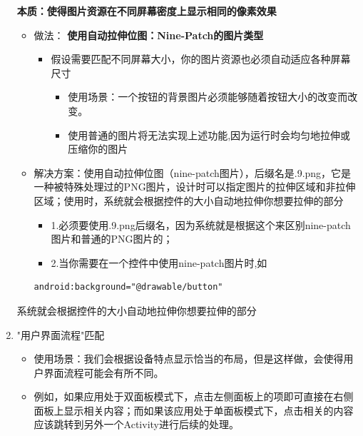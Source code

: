 \documentclass[9pt, b5paper]{article}
\begin{document}
\begin{enumerate}
\textbf{本质：使得图片资源在不同屏幕密度上显示相同的像素效果}
\begin{itemize}
\item 做法： \textbf{使用自动拉伸位图：Nine-Patch的图片类型}
\begin{itemize}
\item 假设需要匹配不同屏幕大小，你的图片资源也必须自动适应各种屏幕尺寸
\begin{itemize}
\item 使用场景：一个按钮的背景图片必须能够随着按钮大小的改变而改变。
\item 使用普通的图片将无法实现上述功能,因为运行时会均匀地拉伸或压缩你的图片
\end{itemize}
\end{itemize}
\item 解决方案：使用自动拉伸位图（nine-patch图片），后缀名是.9.png，它是一种被特殊处理过的PNG图片，设计时可以指定图片的拉伸区域和非拉伸区域；使用时，系统就会根据控件的大小自动地拉伸你想要拉伸的部分
\begin{itemize}
\item 1.必须要使用.9.png后缀名，因为系统就是根据这个来区别nine-patch图片和普通的PNG图片的；
\item 2.当你需要在一个控件中使用nine-patch图片时,如
\end{itemize}
\begin{verbatim}
android:background="@drawable/button"
\end{verbatim}
\end{itemize}

系统就会根据控件的大小自动地拉伸你想要拉伸的部分

\item "用户界面流程"匹配
\label{sec-6-6-1-4}
\begin{itemize}
\item 使用场景：我们会根据设备特点显示恰当的布局，但是这样做，会使得用户界面流程可能会有所不同。
\item 例如，如果应用处于双面板模式下，点击左侧面板上的项即可直接在右侧面板上显示相关内容；而如果该应用处于单面板模式下，点击相关的内容应该跳转到另外一个Activity进行后续的处理。
\end{itemize}


\end{enumerate}
\end{document}
